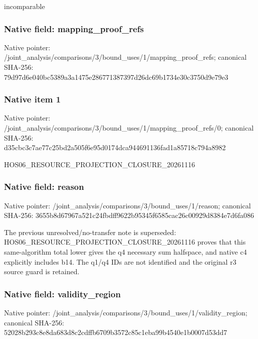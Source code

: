 \documentclass[10pt,a4paper]{article}
\begin{document}
\begingroup\raggedright\sloppy incomparable\par\endgroup

\subsubsection{Native field: mapping\_\allowbreak{}proof\_\allowbreak{}refs}
Native pointer: /joint\_\allowbreak{}analysis/comparisons/3/bound\_\allowbreak{}uses/1/mapping\_\allowbreak{}proof\_\allowbreak{}refs; canonical SHA-256: 79d97d6e040bc5389a3a1475e286771387397d26dc69b1734e30c3750d9e79e3

\subsubsection{Native item 1}
Native pointer: /joint\_\allowbreak{}analysis/comparisons/3/bound\_\allowbreak{}uses/1/mapping\_\allowbreak{}proof\_\allowbreak{}refs/0; canonical SHA-256: d35cbc3c7ae77c25bd2a505f6e95d0174dca944691136fad1a85718c794a8982

\begingroup\raggedright\sloppy HOS06\_\allowbreak{}RESOURCE\_\allowbreak{}PROJECTION\_\allowbreak{}CLOSURE\_\allowbreak{}20261116\par\endgroup

\subsubsection{Native field: reason}
Native pointer: /joint\_\allowbreak{}analysis/comparisons/3/bound\_\allowbreak{}uses/1/reason; canonical SHA-256: 3655b8d67967a521c24fbdff9622b95345f6585cac26c00929d8384e7d6fa086

\begingroup\raggedright\sloppy The previous unresolved/\allowbreak{}no-transfer note is superseded:\allowbreak{} HOS06\_\allowbreak{}RESOURCE\_\allowbreak{}PROJECTION\_\allowbreak{}CLOSURE\_\allowbreak{}20261116 proves that this same-algorithm total lower gives the q4 necessary sum halfspace,\allowbreak{} and native c4 explicitly includes b14. The q1/\allowbreak{}q4 IDs are not identified and the original r3 source guard is retained.\par\endgroup

\subsubsection{Native field: validity\_\allowbreak{}region}
Native pointer: /joint\_\allowbreak{}analysis/comparisons/3/bound\_\allowbreak{}uses/1/validity\_\allowbreak{}region; canonical SHA-256: 52028b293c8e8da683d8c2cdffb6709b3572c85c1eba99b4540e1b0007d53dd7
\end{document}
